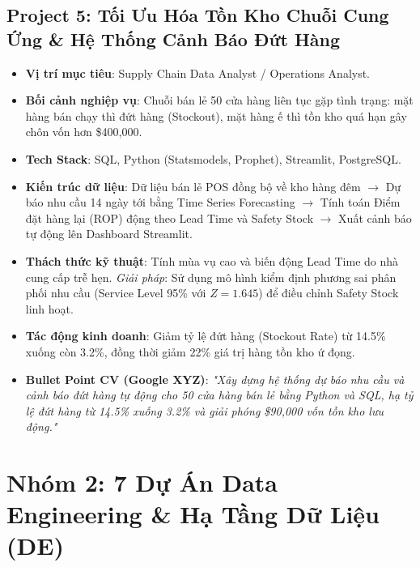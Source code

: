 \subsection{Project 5: Tối Ưu Hóa Tồn Kho Chuỗi Cung Ứng \& Hệ Thống Cảnh Báo Đứt Hàng}
\begin{itemize}
    \item \textbf{Vị trí mục tiêu}: Supply Chain Data Analyst / Operations Analyst.
    \item \textbf{Bối cảnh nghiệp vụ}: Chuỗi bán lẻ 50 cửa hàng liên tục gặp tình trạng: mặt hàng bán chạy thì đứt hàng (Stockout), mặt hàng ế thì tồn kho quá hạn gây chôn vốn hơn \$400,000.
    \item \textbf{Tech Stack}: SQL, Python (Statsmodels, Prophet), Streamlit, PostgreSQL.
    \item \textbf{Kiến trúc dữ liệu}: Dữ liệu bán lẻ POS đồng bộ về kho hàng đêm $\rightarrow$ Dự báo nhu cầu 14 ngày tới bằng Time Series Forecasting $\rightarrow$ Tính toán Điểm đặt hàng lại (ROP) động theo Lead Time và Safety Stock $\rightarrow$ Xuất cảnh báo tự động lên Dashboard Streamlit.
    \item \textbf{Thách thức kỹ thuật}: Tính mùa vụ cao và biến động Lead Time do nhà cung cấp trễ hẹn. \textit{Giải pháp}: Sử dụng mô hình kiểm định phương sai phân phối nhu cầu (Service Level 95\% với $Z = 1.645$) để điều chỉnh Safety Stock linh hoạt.
    \item \textbf{Tác động kinh doanh}: Giảm tỷ lệ đứt hàng (Stockout Rate) từ 14.5\% xuống còn 3.2\%, đồng thời giảm 22\% giá trị hàng tồn kho ứ đọng.
    \item \textbf{Bullet Point CV (Google XYZ)}: \textit{"Xây dựng hệ thống dự báo nhu cầu và cảnh báo đứt hàng tự động cho 50 cửa hàng bán lẻ bằng Python và SQL, hạ tỷ lệ đứt hàng từ 14.5\% xuống 3.2\% và giải phóng \$90,000 vốn tồn kho lưu động."}
\end{itemize}

\section{Nhóm 2: 7 Dự Án Data Engineering \& Hạ Tầng Dữ Liệu (DE)}

